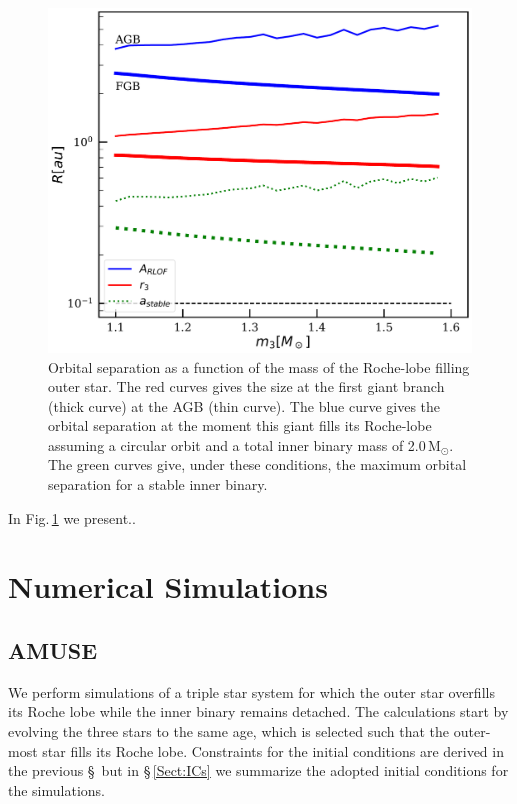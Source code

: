 \documentclass{aastex62}
\newcommand{\MSun}{\mbox{M$_\odot$}}
\begin{document}
\begin{figure}[ht!]
  \includegraphics[width=\columnwidth]{fig_minimumstablesize.pdf}
\caption{Orbital separation as a function of the mass of the
  Roche-lobe filling outer star. The red curves gives the size at the
  first giant branch (thick curve) at the AGB (thin curve). The
  blue curve gives the orbital separation at the moment this giant fills its
  Roche-lobe assuming a circular orbit and a total inner binary mass
  of 2.0\,\MSun. The green curves give, under these conditions, the
  maximum orbital separation for a stable inner binary.
\label{fig:tertiarymass_vs_size}}
\end{figure}

In Fig.\,\ref{fig:tertiarymass_vs_size} we present..

\section{Numerical Simulations} \label{sims}

\subsection{AMUSE} \label{amuse}

We perform simulations of a triple star system for which the outer star
overfills its Roche lobe while the inner binary remains detached. The
calculations start by evolving the three stars to the same age, which
is selected such that the outer-most star fills its Roche lobe.
Constraints for the initial conditions are derived in the previous
\S\, but in \S\,\ref{Sect:ICs} we summarize the adopted initial
conditions for the simulations.
\end{document}
